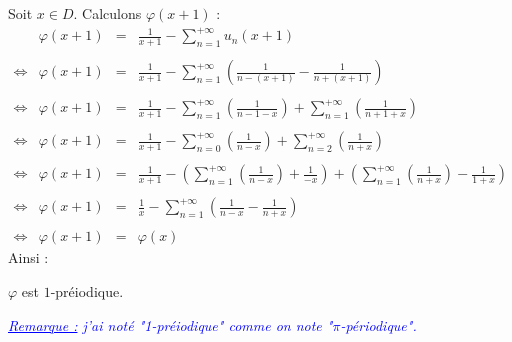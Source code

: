 Soit $x \in D$. Calculons $\varphi(x + 1)$ :
\[
  \begin{array}{crcl}
         & \varphi(x + 1) & = & \frac{1}{x+1} - \sum\limits_{n=1}^{+\infty} u_n(x+1)                                                                                \\\\
    \iff & \varphi(x + 1) & = & \frac{1}{x+1} - \sum\limits_{n=1}^{+\infty} \left(\frac{1}{n-(x+1)}-\frac{1}{n+(x+1)}\right)                                        \\\\
    \iff & \varphi(x + 1) & = & \frac{1}{x+1} - \sum\limits_{n=1}^{+\infty} \left(\frac{1}{n-1-x}\right) + \sum\limits_{n=1}^{+\infty} \left(\frac{1}{n+1+x}\right) \\\\
    \iff & \varphi(x + 1) & = & \frac{1}{x+1}
    -
    \sum\limits_{n=0}^{+\infty} \left(\frac{1}{n-x}\right)
    +
    \sum\limits_{n=2}^{+\infty} \left(\frac{1}{n+x}\right)
    \\\\
    \iff & \varphi(x + 1) & = & \frac{1}{x+1}
    -
    \left(\sum\limits_{n=1}^{+\infty} \left(\frac{1}{n-x}\right) + \frac{1}{-x} \right)
    +
    \left(\sum\limits_{n=1}^{+\infty} \left(\frac{1}{n+x}\right) - \frac{1}{1+x} \right)
    \\\\
    \iff & \varphi(x + 1) & = & \frac{1}{x}
    -
    \sum\limits_{n=1}^{+\infty} \left(\frac{1}{n-x} - \frac{1}{n+x}\right)
    \\\\
    \iff & \varphi(x + 1) & = & \varphi(x)
  \end{array}
\]
Ainsi :
\begin{result}
  $\varphi$ est $1$-préiodique.
\end{result}

\textcolor{Blue}{\textit{\ul{Remarque :} j'ai noté "1-préiodique" comme on note "$\pi$-périodique".}}
